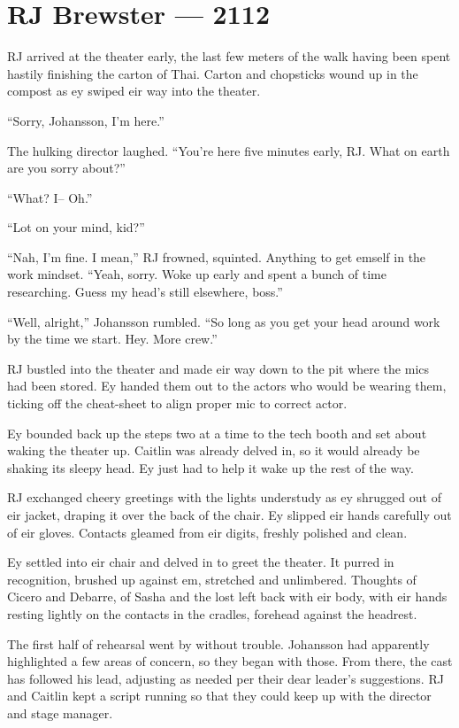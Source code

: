 \hypertarget{rj-brewster-2112}{%
\chapter*{RJ Brewster — 2112}\label{rj-brewster-2112}}

RJ arrived at the theater early, the last few meters of the walk having been spent hastily finishing the carton of Thai. Carton and chopsticks wound up in the compost as ey swiped eir way into the theater.

``Sorry, Johansson, I'm here.''

The hulking director laughed. ``You're here five minutes early, RJ. What on earth are you sorry about?''

``What? I-- Oh.''

``Lot on your mind, kid?''

``Nah, I'm fine. I mean,'' RJ frowned, squinted. Anything to get emself in the work mindset. ``Yeah, sorry. Woke up early and spent a bunch of time researching. Guess my head's still elsewhere, boss.''

``Well, alright,'' Johansson rumbled. ``So long as you get your head around work by the time we start. Hey. More crew.''

RJ bustled into the theater and made eir way down to the pit where the mics had been stored. Ey handed them out to the actors who would be wearing them, ticking off the cheat-sheet to align proper mic to correct actor.

Ey bounded back up the steps two at a time to the tech booth and set about waking the theater up. Caitlin was already delved in, so it would already be shaking its sleepy head. Ey just had to help it wake up the rest of the way.

RJ exchanged cheery greetings with the lights understudy as ey shrugged out of eir jacket, draping it over the back of the chair. Ey slipped eir hands carefully out of eir gloves. Contacts gleamed from eir digits, freshly polished and clean.

Ey settled into eir chair and delved in to greet the theater. It purred in recognition, brushed up against em, stretched and unlimbered. Thoughts of Cicero and Debarre, of Sasha and the lost left back with eir body, with eir hands resting lightly on the contacts in the cradles, forehead against the headrest.

The first half of rehearsal went by without trouble. Johansson had apparently highlighted a few areas of concern, so they began with those. From there, the cast has followed his lead, adjusting as needed per their dear leader's suggestions. RJ and Caitlin kept a script running so that they could keep up with the director and stage manager.

